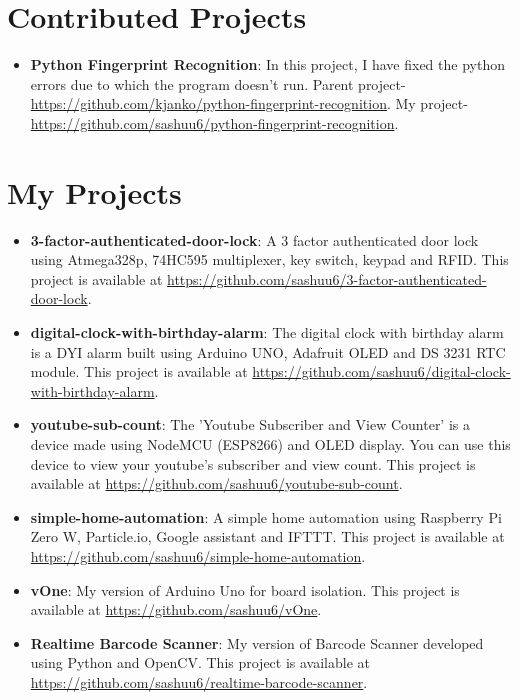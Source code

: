 \documentclass[letterpaper,11pt]{article}
\newcommand{\resumeItem}[2]{
  \item\small{
    \textbf{#1}{: #2 \vspace{-2pt}}
  }
}
\newcommand{\resumeSubItem}[2]{\resumeItem{#1}{#2}\vspace{-4pt}}
\newcommand{\resumeSubHeadingListStart}{\begin{itemize}[leftmargin=*]}
\newcommand{\resumeSubHeadingListEnd}{\end{itemize}}
\begin{document}
\section{Contributed Projects}
  \resumeSubHeadingListStart
    \resumeSubItem{Python Fingerprint Recognition}
      { In this project, I have fixed the python errors due to which the program doesn't run. Parent project-\url{https://github.com/kjanko/python-fingerprint-recognition}. My project-\url{https://github.com/sashuu6/python-fingerprint-recognition}.}
  \resumeSubHeadingListEnd

\section{My Projects}
  \resumeSubHeadingListStart
    \resumeSubItem{3-factor-authenticated-door-lock}
      { A 3 factor authenticated door lock using Atmega328p, 74HC595 multiplexer, key switch, keypad and RFID. This project is available at \url{https://github.com/sashuu6/3-factor-authenticated-door-lock}.}
    \resumeSubItem{digital-clock-with-birthday-alarm}
      {The digital clock with birthday alarm is a DYI alarm built using Arduino UNO, Adafruit OLED and DS 3231 RTC module. This project is available at \url{https://github.com/sashuu6/digital-clock-with-birthday-alarm}.}
    \resumeSubItem{youtube-sub-count}
      {The 'Youtube Subscriber and View Counter' is a device made using NodeMCU (ESP8266) and OLED display. You can use this device to view your youtube's subscriber and view count. This project is available at \url{https://github.com/sashuu6/youtube-sub-count}.}
    \resumeSubItem{simple-home-automation}
      {A simple home automation using Raspberry Pi Zero W, Particle.io, Google assistant and IFTTT. This project is available at \url{https://github.com/sashuu6/simple-home-automation}.}
      \resumeSubItem{vOne}
      {My version of Arduino Uno for board isolation. This project is available at \url{https://github.com/sashuu6/vOne}.}
       \resumeSubItem{Realtime Barcode Scanner}
      {My version of Barcode Scanner developed using Python and OpenCV. This project is available at \url{https://github.com/sashuu6/realtime-barcode-scanner}.}
  \resumeSubHeadingListEnd

\end{document}
